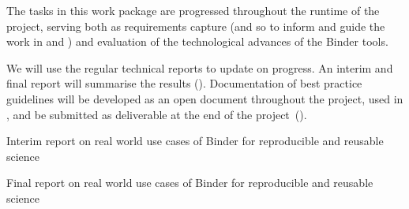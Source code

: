 \begin{workpackage}
\begin{wpdescription}
  \medskip

  The tasks in this work package are progressed throughout the runtime of the
  project, serving both as requirements capture (and so to inform and guide the
  work in  and ) and evaluation of the
  technological advances of the Binder tools.

  We will use the regular technical reports to update on progress. An
  interim  and final
  report will summarise the results ().
  Documentation of best practice guidelines will be developed as an open
  document throughout the project, used in , and be submitted
  as deliverable at the end of the project~().
\end{wpdescription}

\begin{tasklist}


%



\end{tasklist}


\begin{wpdelivs}
  \begin{wpdeliv}[
    id=report-use-cases-interim,
    lead=MP,
    due=18,
    dissem=PU,
    nature=DEC,
    ]
    {
      Interim report on real world use cases of Binder for reproducible and reusable science
    }
  \end{wpdeliv}

  \begin{wpdeliv}[
    id=report-use-cases,
    lead=MP,
    due=34,
    dissem=PU,
    nature=DEC,
    ]
    {
      Final report on real world use cases of Binder for reproducible and reusable science
    }
  \end{wpdeliv}



\end{wpdelivs}
\end{workpackage}

